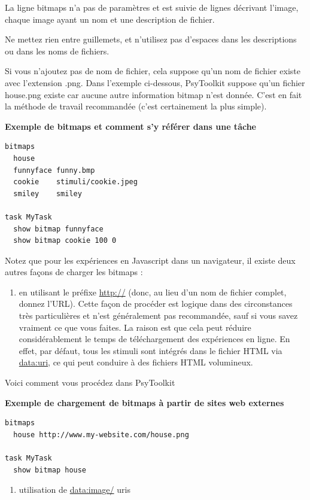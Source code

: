 \documentclass[
]{book}
\providecommand{\tightlist}{%
  \setlength{\itemsep}{0pt}\setlength{\parskip}{0pt}}
\begin{document}
La ligne bitmaps n'a pas de paramètres et est suivie de lignes décrivant l'image, chaque image ayant un nom et une description de fichier.

Ne mettez rien entre guillemets, et n'utilisez pas d'espaces dans les descriptions ou dans les noms de fichiers.

Si vous n'ajoutez pas de nom de fichier, cela suppose qu'un nom de fichier existe avec l'extension .png. Dans l'exemple ci-dessous, PsyToolkit suppose qu'un fichier house.png existe car aucune autre information bitmap n'est donnée. C'est en fait la méthode de travail recommandée (c'est certainement la plus simple).

\textbf{Exemple de bitmaps et comment s'y référer dans une tâche}

\begin{verbatim}
bitmaps
  house
  funnyface funny.bmp
  cookie    stimuli/cookie.jpeg
  smiley    smiley

task MyTask
  show bitmap funnyface
  show bitmap cookie 100 0
\end{verbatim}

Notez que pour les expériences en Javascript dans un navigateur, il existe deux autres façons de charger les bitmaps :

\begin{enumerate}
\def\labelenumi{\arabic{enumi}.}
\tightlist
\item
  en utilisant le préfixe \url{http://} (donc, au lieu d'un nom de fichier complet, donnez l'URL). Cette façon de procéder est logique dans des circonstances très particulières et n'est généralement pas recommandée, sauf si vous savez vraiment ce que vous faites. La raison est que cela peut réduire considérablement le temps de téléchargement des expériences en ligne. En effet, par défaut, tous les stimuli sont intégrés dans le fichier HTML via \url{data:uri}, ce qui peut conduire à des fichiers HTML volumineux.
\end{enumerate}

Voici comment vous procédez dans PsyToolkit

\textbf{Exemple de chargement de bitmaps à partir de sites web externes}

\begin{verbatim}
bitmaps
  house http://www.my-website.com/house.png

task MyTask
  show bitmap house
\end{verbatim}

\begin{enumerate}
\def\labelenumi{\arabic{enumi}.}
\setcounter{enumi}{1}
\tightlist
\item
  utilisation de \url{data:image/} uris
\end{enumerate}
\end{document}

